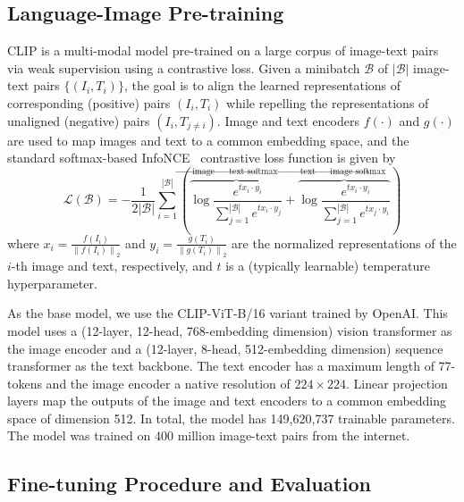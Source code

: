 \documentclass[10pt]{article} %
\begin{document}
\subsection{Language-Image Pre-training}
\label{sec:pretraining}


CLIP \citep[Contrastive Language-Image Pretraining;][]{radford2021learning} is a multi-modal model pre-trained on a large corpus of image-text pairs via weak supervision using a contrastive loss. Given a minibatch $\mathcal{B}$ of $|\mathcal{B}|$ image-text pairs $\{(I_i, T_i)\}$, the goal is to align the learned representations of corresponding (positive) pairs $(I_i, T_i)$ while repelling the representations of unaligned (negative) pairs $(I_i, T_{j\neq i})$. Image and text encoders $f(\cdot)$ and $g(\cdot)$ are used to map images and text to a common embedding space, and the standard softmax-based InfoNCE~\citep{oord2018representation} contrastive loss function is given by
\begin{equation}
\mathcal L(\mathcal B) = -\frac{1}{2|\mathcal{B}|} \sum_{i=1}^{|\mathcal{B}|}\left(\overbrace{\log \frac{e^{t {x}_i \cdot {y}_i}}{\sum_{j=1}^{|\mathcal{B}|} e^{t {x}_i \cdot {y}_j}}}^{\text {image } \rightarrow \text { text softmax }}+\overbrace{\log \frac{e^{t {x}_i \cdot {y}_i}}{\sum_{j=1}^{|\mathcal{B}|} e^{t {x}_j \cdot {y}_i}}}^{\text {text } \rightarrow \text { image softmax }}\right)
\end{equation}
where ${x}_i=\frac{f\left(I_i\right)}{\left\|f\left(I_i\right)\right\|_2}$ and ${y}_i=\frac{g\left(T_i\right)}{\left\|g\left(T_i\right)\right\|_2}$ are the normalized representations of the $i$-th image and text, respectively, and $t$ is a (typically learnable) temperature hyperparameter.

As the base model, we use the CLIP-ViT-B/16 \citep{radford2021learning} variant trained by OpenAI. This model uses a (12-layer, 12-head, 768-embedding dimension) vision transformer as the image encoder and a (12-layer, 8-head, 512-embedding dimension) sequence transformer as the text backbone. The text encoder has a maximum length of 77-tokens and the image encoder a native resolution of $224\times224$. Linear projection layers map the outputs of the image and text encoders to a common embedding space of dimension 512. In total, the model has 149,620,737 trainable parameters. The model was trained on 400 million image-text pairs from the internet. 

\subsection{Fine-tuning Procedure and Evaluation}
\label{sec:finetuning}
\end{document}
